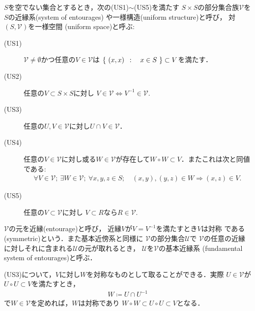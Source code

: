 	\begin{screen}
		\begin{dfn}[近縁系]\label{dfn:uniform_structure}
			$S$を空でない集合とするとき，次の(US1)$\sim$(US5)を満たす
			$S \times S$の部分集合族$\mathscr{V}$を
			$S$の近縁系(system of entourages)
			や一様構造(uniform structure)と呼び，
			対$(S,\mathscr{V})$を一様空間
			(uniform space)と呼ぶ:
			\begin{description}
				\item[(US1)] $\mathscr{V} \neq \emptyset$かつ任意の$V \in \mathscr{V}$は
					$\left\{\ (x,x)\ \, : \quad x \in S\ \right\} \subset V$を満たす．
					
				\item[(US2)] 任意の$V \subset S \times S$に対し
					$V \in \mathscr{V} \Longleftrightarrow V^{-1} \in \mathscr{V}$.
				\item[(US3)] 任意の$U,V \in \mathscr{V}$に対し$U \cap V \in \mathscr{V}$．
				\item[(US4)] 任意の$V \in \mathscr{V}$に対し或る$W \in \mathscr{V}$が存在して$W \circ W \subset V$．またこれは次と同値である:
					\begin{align}
						\forall V \in \mathscr{V};\ 
						\exists W \in \mathscr{V};\ 
						\forall x,y,z \in S;\quad
						(x,y),(y,z) \in W \Longrightarrow (x,z) \in V.
					\end{align}
					
				\item[(US5)] 任意の$V \subset \mathscr{V}$に対し
					$V \subset R$なら$R \in \mathscr{V}$.
			\end{description}
			$\mathscr{V}$の元を近縁(entourage)と呼び，
			近縁$V$が$V = V^{-1}$を満たすとき$V$は対称
			である(symmetric)という．また基本近傍系と同様に
			$\mathscr{V}$の部分集合$\mathscr{U}$で
			$\mathscr{V}$の任意の近縁に対しそれに含まれる$\mathscr{U}$の元が取れるとき，
			$\mathscr{U}$を$\mathscr{V}$の基本近縁系
			\index{きほんきんえんけい@基本近縁系}(fundamental system of entourages)と呼ぶ．
		\end{dfn}
	\end{screen}
	(US3)について，$V$に対し$W$を対称なものとして取ることができる．実際
	$U \in \mathscr{V}$が$U \circ U \subset V$を満たすとき，
	\begin{align}
		W \coloneqq U \cap U^{-1}
	\end{align}
	で$W \in \mathscr{V}$を定めれば，$W$は対称であり
	$W \circ W \subset U \circ U \subset V$となる．
	
